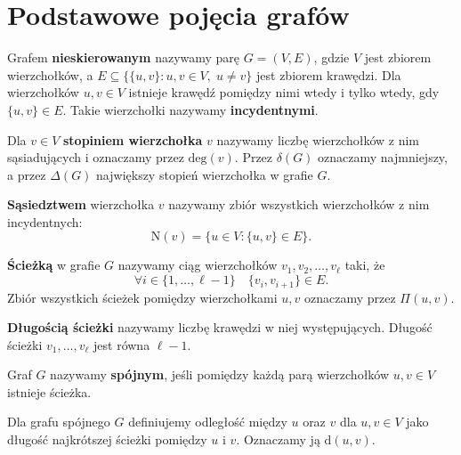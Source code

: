 \section{Podstawowe pojęcia grafów}

\begin{definition}
Grafem \textbf{nieskierowanym} nazywamy parę $G = (V, E)$, gdzie $V$ jest zbiorem wierzchołków, a $E \subseteq \{ \{u, v\} : u, v \in V, \; u \neq v \}$ jest zbiorem krawędzi.  
Dla wierzchołków $u, v \in V$ istnieje krawędź pomiędzy nimi wtedy i tylko wtedy, gdy $\{u, v\} \in E$. Takie wierzchołki nazywamy \textbf{incydentnymi}.
\end{definition}

\begin{definition}
Dla $v \in V$ \textbf{stopiniem wierzchołka} $v$ nazywamy liczbę wierzchołków z nim sąsiadujących i oznaczamy przez $\mathrm{deg}(v)$.  
Przez $\delta(G)$ oznaczamy najmniejszy, a przez $\Delta(G)$ największy stopień wierzchołka w grafie $G$.
\end{definition}

\begin{definition}
\textbf{Sąsiedztwem} wierzchołka $v$ nazywamy zbiór wszystkich wierzchołków z nim incydentnych:
\[
\mathrm{N}(v) = \{ u \in V : \{u, v\} \in E \}.
\]
\end{definition}

\begin{definition}
\textbf{Ścieżką} w grafie $G$ nazywamy ciąg wierzchołków $v_1, v_2, \dots, v_\ell$ taki, że
\[
\forall i \in \{1, \dots, \ell - 1\} \quad \{v_i, v_{i+1}\} \in E.
\]
Zbiór wszystkich ścieżek pomiędzy wierzchołkami $u, v$ oznaczamy przez $\Pi(u, v)$.
\end{definition}

\begin{definition}
\textbf{Długością ścieżki} nazywamy liczbę krawędzi w niej występujących. Długość ścieżki $v_1, \dots, v_\ell$ jest równa $\ell - 1$.
\end{definition}

\begin{definition}
Graf $G$ nazywamy \textbf{spójnym}, jeśli pomiędzy każdą parą wierzchołków $u, v \in V$ istnieje ścieżka.
\end{definition}

\begin{definition}
Dla grafu spójnego $G$ definiujemy odległość między $u$ oraz $v$ dla $u,v\in V$ jako długość najkrótszej ścieżki pomiędzy $u$ i $v$. Oznaczamy ją $\mathrm{d}(u,v)$.
\end{definition}

